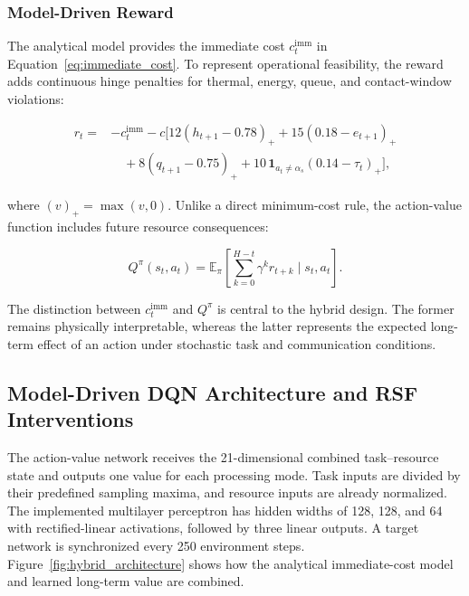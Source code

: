 \documentclass[lettersize,journal]{IEEEtran}
\begin{document}
\subsubsection{Model-Driven Reward}

The analytical model provides the immediate cost $c_t^{\mathrm{imm}}$ in Equation~\eqref{eq:immediate_cost}. To represent operational feasibility, the reward adds continuous hinge penalties for thermal, energy, queue, and contact-window violations:

\begin{equation}
\begin{aligned}
r_t ={}&-c_t^{\mathrm{imm}}-c\big[12(h_{t+1}-0.78)_+
+15(0.18-e_{t+1})_+\\
&\quad+8(q_{t+1}-0.75)_+
+10\,\mathbf{1}_{a_t\ne\alpha_s}(0.14-\tau_t)_+\big],
\end{aligned}
\label{eq:dynamic_reward}
\end{equation}

where $(v)_+=\max(v,0)$. Unlike a direct minimum-cost rule, the action-value function includes future resource consequences:

\begin{equation}
Q^{\pi}(s_t,a_t)=\mathbb{E}_{\pi}\!\left[\sum_{k=0}^{H-t}\gamma^k r_{t+k}\mid s_t,a_t\right].
\label{eq:long_term_value}
\end{equation}

The distinction between $c_t^{\mathrm{imm}}$ and $Q^{\pi}$ is central to the hybrid design. The former remains physically interpretable, whereas the latter represents the expected long-term effect of an action under stochastic task and communication conditions.

\subsection{Model-Driven DQN Architecture and RSF Interventions}
\label{sec:network_architecture}

The action-value network receives the 21-dimensional combined task--resource state and outputs one value for each processing mode. Task inputs are divided by their predefined sampling maxima, and resource inputs are already normalized. The implemented multilayer perceptron has hidden widths of 128, 128, and 64 with rectified-linear activations, followed by three linear outputs. A target network is synchronized every 250 environment steps. Figure~\ref{fig:hybrid_architecture} shows how the analytical immediate-cost model and learned long-term value are combined.
\end{document}
